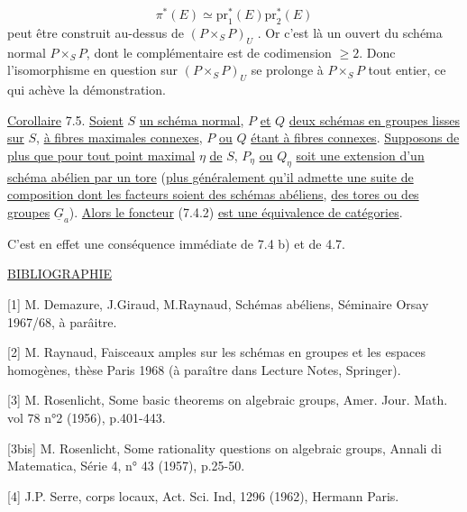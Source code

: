 \begin{equation*}
\pi^*(E) \simeq \mathrm{pr}_1^*(E)\mathrm{pr}_2^*(E)
\end{equation*}
peut être construit au-dessus de $(P \times_S P)_U$ . Or c'est là un ouvert du schéma normal $P \times_S P$, dont le complémentaire est de codimension $\geq 2$. Donc l'isomorphisme en question sur $(P \times_S P)_U$ se prolonge à $P \times_S P$ tout entier, ce qui achève la démonstration.

\underline{Corollaire} 7.5. \underline{Soient} $S$ \underline{un schéma normal}, $P$ \underline{et} $Q$ \underline{deux schémas en groupes lisses sur} $S$, \underline{à fibres maximales connexes}, $P$ \underline{ou} $Q$ \underline{étant à fibres connexes}. \underline{Supposons de plus que pour tout point maximal} $\eta$ \underline{de} $S$, $P_\eta$ \underline{ou} $Q_\eta$ \underline{soit une extension d'un schéma abélien par un tore} (\underline{plus généralement qu'il admette une suite de composition dont les facteurs soient des schémas abéliens}, \underline{des tores ou des groupes} $\underline{G}_a$). \underline{Alors le foncteur} (7.4.2) \underline{est une équivalence de catégories}.

C'est en effet une conséquence immédiate de 7.4 b) et de 4.7.


\underline{BIBLIOGRAPHIE}

[1] \quad M. Demazure, J.Giraud, M.Raynaud, Schémas abéliens, Séminaire Orsay 1967/68, à parâitre.

[2] \quad M. Raynaud, Faisceaux amples sur les schémas en groupes et les espaces homogènes, thèse Paris 1968 (à paraître dans Lecture Notes, Springer).

[3] \quad M. Rosenlicht, Some basic theorems on algebraic groups, Amer. Jour. Math. vol 78 n°2 (1956), p.401-443.

[3bis] M. Rosenlicht, Some rationality questions on algebraic groups, Annali di Matematica, Série 4, n° 43 (1957), p.25-50.

[4] \quad J.P. Serre, corps locaux, Act. Sci. Ind, 1296 (1962), Hermann Paris.
